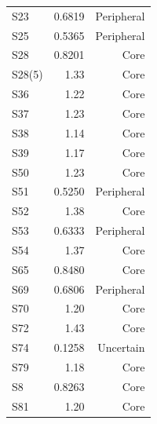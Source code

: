 \begin{longtable}{lrr}
  S23 & 0.6819 & Peripheral \\
  S25 & 0.5365 & Peripheral \\
  S28 & 0.8201 & Core \\
  S28(5) & 1.33 & Core \\
  S36 & 1.22 & Core \\
  S37 & 1.23 & Core \\
  S38 & 1.14 & Core \\
  S39 & 1.17 & Core \\
  S50 & 1.23 & Core \\
  S51 & 0.5250 & Peripheral \\
  S52 & 1.38 & Core \\
  S53 & 0.6333 & Peripheral \\
  S54 & 1.37 & Core \\
  S65 & 0.8480 & Core \\
  S69 & 0.6806 & Peripheral \\
  S70 & 1.20 & Core \\
  S72 & 1.43 & Core \\
  S74 & 0.1258 & Uncertain \\
  S79 & 1.18 & Core \\
  S8 & 0.8263 & Core \\
  S81 & 1.20 & Core \\
\end{longtable}
